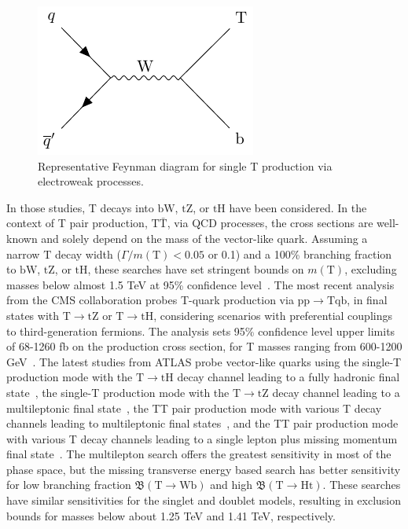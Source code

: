\begin{figure}
\centering
\includegraphics[width=0.6\linewidth]{Images/T_prod_qed.pdf}
\caption{Representative Feynman diagram for single T production via electroweak processes.\label{fig:qed_T_prod}}
\end{figure}


In those studies, \textrm{T} decays into $\mathrm{bW}$, $\mathrm{tZ}$, or $\mathrm{tH}$ have been considered. In the context of \textrm{T} pair production, $\mathrm{T}\bar{\mathrm{T}}$, via QCD processes, the cross sections are well-known and solely depend on the mass of the vector-like quark.  Assuming a narrow $\mathrm{T}$ decay width ($\Gamma / m(\mathrm{T}) < 0.05$ or 0.1) and a 100\% branching fraction to $\textrm{bW}$, $\textrm{tZ}$, or $\textrm{tH}$, these searches have set stringent bounds on $m(\mathrm{T})$, excluding masses below almost 1.5 \textrm{TeV} at 95\% confidence level~\parencite{CMS:2024bni,CMS:2024qdd,ATLAS:2022ozf,ATLAS:2023bfh,ATLAS:2022hnn,ATLAS:2022tla,ATLAS:2023pja,ATLAS:2024fdw}. The most recent analysis from the CMS collaboration probes T-quark production via $\mathrm{pp} \to \mathrm{T}\textrm{qb}$, in final states with $\mathrm{T} \to \textrm{tZ}$ or $\mathrm{T} \to \textrm{tH}$, considering scenarios with preferential couplings to third-generation fermions. The analysis sets 95\% confidence level upper limits of 68-1260 \textrm{fb} on the production cross section, for T masses ranging from 600-1200 \textrm{GeV}~\parencite{CMS:2024qdd}. The latest studies from ATLAS probe vector-like quarks using the single-T production mode with the $\mathrm{T} \to \textrm{tH}$ decay channel leading to a fully hadronic final state~\parencite{ATLAS:2022ozf}, the single-T production mode with the $\mathrm{T} \to \textrm{tZ}$ decay channel leading to a multileptonic final state~\parencite{ATLAS:2023bfh}, the TT pair production mode with various T decay channels leading to multileptonic final states~\parencite{ATLAS:2022hnn}, and the TT pair production mode with various T decay channels leading to a single lepton plus missing momentum final state~\parencite{ATLAS:2022tla,ATLAS:2023pja}. 
The multilepton search offers the greatest sensitivity in most of the phase space, but the missing transverse energy based search has better sensitivity for low branching fraction $\mathfrak{B}(\mathrm{T}\to \textrm{Wb})$ and high $\mathfrak{B}(\mathrm{T}\to \textrm{Ht})$. These searches have similar sensitivities for the singlet and doublet models, resulting in exclusion bounds for masses below about 1.25 \textrm{TeV} and 1.41 \textrm{TeV}, respectively. 


